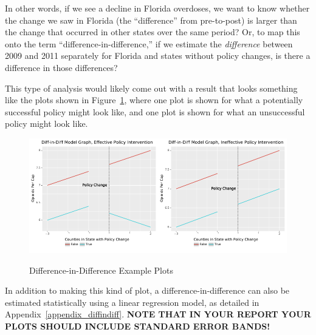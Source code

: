 \documentclass[12pt]{article}
\begin{document}
In other words, if we see a decline in Florida overdoses, we want to know whether the change we saw in Florida (the ``difference'' from pre-to-post) is larger than the change that occurred in other states over the same period? Or, to map this onto the term ``difference-in-difference,'' if we estimate the \emph{difference} between 2009 and 2011 separately for Florida and states without policy changes, is there a difference in those differences?

This type of analysis would likely come out with a result that looks something like the plots shown in Figure~\ref{figure_diffindiff_examples}, where one plot is shown for what a potentially successful policy might look like, and one plot is shown for what an unsuccessful policy might look like.

\begin{figure}[h!]
  \centering
  \caption{Difference-in-Difference Example Plots}\label{figure_diffindiff_examples}
  \includegraphics[width=0.5\textwidth]{images/diffindiff_successful.pdf}\includegraphics[width=0.5\textwidth]{images/diffindiff_failed.pdf}
\end{figure}

In addition to making this kind of plot, a difference-in-difference can also be estimated statistically using a linear regression model, as detailed in Appendix~\ref{appendix_diffindiff}. \textbf{NOTE THAT IN YOUR REPORT YOUR PLOTS SHOULD INCLUDE STANDARD ERROR BANDS!}
\end{document}
